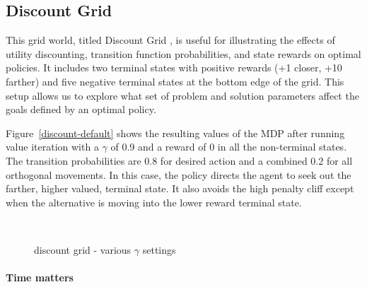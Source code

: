 \documentclass{sig-alternate}
\begin{document}
\subsection{Discount Grid}

This grid world, titled Discount Grid \cite{project3}, is useful for illustrating the effects of utility discounting, transition function probabilities, and state rewards on optimal policies. It includes two terminal states with positive rewards (+1 closer, +10 farther) and five negative terminal states at the bottom edge of the grid. This setup allows us to explore what set of problem and solution parameters affect the goals defined by an optimal policy.

Figure~\ref{discount-default} shows the resulting values of the MDP after running value iteration with a $\gamma$ of 0.9 and a reward of 0 in all the non-terminal states. The transition probabilities are 0.8 for desired action and a combined 0.2 for all orthogonal movements. In this case, the policy directs the agent to seek out the farther, higher valued, terminal state. It also avoids the high penalty cliff except when the alternative is moving into the lower reward terminal state.

\begin{figure}[!htbp]
    \centering
    ~
    \caption{discount grid - various $\gamma$ settings}
\end{figure} 

\paragraph{Time matters}
\end{document}
